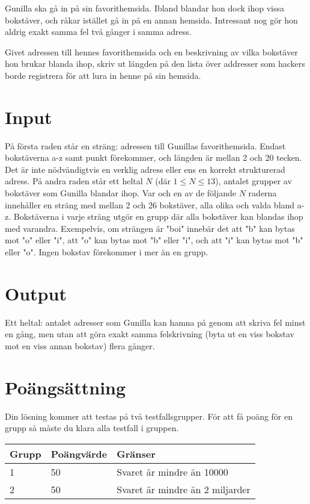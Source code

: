 
Gunilla ska gå in på sin favorithemsida. Ibland blandar hon dock ihop vissa bokstäver, och råkar istället gå in på en annan hemsida. Intressant nog gör hon aldrig exakt samma fel två gånger i samma adress.

Givet adressen till hennes favorithemsida och en beskrivning av vilka bokstäver hon brukar blanda ihop, skriv ut längden på den lista över addresser som hackers borde registrera för att lura in henne på sin hemsida.

\section*{Input}

På första raden står en sträng: adressen till Gunillas favorithemsida. Endast bokstäverna a-z samt punkt förekommer, och längden är mellan 2 och 20 tecken. Det är inte nödvändigtvis en verklig adress eller ens en korrekt strukturerad adress. På andra raden står ett heltal $N$  (där $1 \le N \le 13$), antalet grupper av bokstäver som Gunilla blandar ihop. Var och en av de följande $N$ raderna innehåller en sträng med mellan 2 och 26 bokstäver, alla olika och valda bland a-z. Bokstäverna i varje sträng utgör en grupp där alla bokstäver kan blandas ihop med varandra. Exempelvis, om strängen är "boi" innebär det att "b" kan bytas mot "o" eller "i", att "o" kan bytas mot "b" eller "i", och att "i" kan bytas mot "b" eller "o". Ingen bokstav förekommer i mer än en grupp.

\section*{Output}

Ett heltal: antalet adresser som Gunilla kan hamna på genom att skriva fel minst en gång, men utan att göra exakt samma felskrivning (byta ut en viss bokstav mot en viss annan bokstav) flera gånger.

\section*{Poängsättning}
Din lösning kommer att testas på två testfallsgrupper. För att få poäng för en grupp
så måste du klara alla testfall i gruppen.

\begin{tabular}{| l | l | l |}
\hline
Grupp & Poängvärde & Gränser \\ \hline
1     & 50         & Svaret är mindre än 10000 \\ 
2     & 50         & Svaret är mindre än 2 miljarder \\ \hline
\end{tabular}


